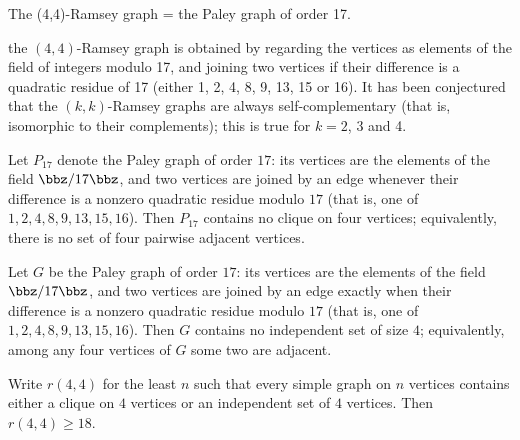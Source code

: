 \begin{definition}[The (4,4)-Ramsey graph = the Paley graph of order 17]
\label{SimpleGraph.paleyGraph17}
The (4,4)-Ramsey graph = the Paley graph of order 17.

the $(4, 4)$-Ramsey graph is obtained by regarding the vertices as elements of the field
of integers modulo 17, and joining two vertices if their difference is a quadratic
residue of 17 (either 1, 2, 4, 8, 9, 13, 15 or 16). It has been conjectured that the
$(k, k)$-Ramsey graphs are always self-complementary (that is, isomorphic to their
complements); this is true for $k = 2$, 3 and 4.
\end{definition}

\begin{theorem}
\label{SimpleGraph.paleyGraph17_cliqueFree_four}
Let $P_{17}$ denote the Paley graph of order $17$: its vertices are the elements of the
field $\bbz/17\bbz$, and two vertices are joined by an edge whenever their difference is
a nonzero quadratic residue modulo $17$ (that is, one of $1, 2, 4, 8, 9, 13, 15, 16$).
Then $P_{17}$ contains no clique on four vertices; equivalently, there is no set of four
pairwise adjacent vertices.
\end{theorem}

\begin{theorem}
\label{SimpleGraph.paleyGraph17_indepSetFree_four}
Let $G$ be the Paley graph of order $17$: its vertices are the elements of the field
$\bbz/17\bbz$, and two vertices are joined by an edge exactly when their difference is a
nonzero quadratic residue modulo $17$ (that is, one of $1, 2, 4, 8, 9, 13, 15, 16$).
Then $G$ contains no independent set of size $4$; equivalently, among any four vertices
of $G$ some two are adjacent.
\end{theorem}

\begin{theorem}
\label{SimpleGraph.eighteen_le_ramseyNumber_four_four}
Write $r(4,4)$ for the least $n$ such that every simple graph on $n$ vertices contains
either a clique on $4$ vertices or an independent set of $4$ vertices. Then $r(4,4) \ge
18$.
\end{theorem}


